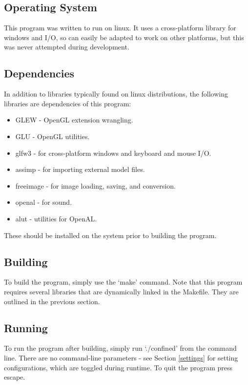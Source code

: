 \documentclass{book}
\begin{document}
    \subsection{Operating System}
      This program was written to run on linux. It uses a cross-platform library for windows and I/O, so can easily be adapted to work on other platforms, but this was never attempted during development.

    \subsection{Dependencies}
      In addition to libraries typically found on linux distributions, the following libraries are dependencies of this program:
      \begin{itemize}
        \item GLEW - OpenGL extension wrangling.
        \item GLU - OpenGL utilities.
        \item glfw3 - for cross-platform windows and keyboard and mouse I/O.
        \item assimp - for importing external model files.
        \item freeimage - for image loading, saving, and conversion.
        \item openal - for sound.
        \item alut - utilities for OpenAL.
      \end{itemize}

      These should be installed on the system prior to building the program.

    \subsection{Building}
      To build the program, simply use the `make' command.
      Note that this program requires several libraries that are dynamically linked in the Makefile. They are outlined in the previous section.

    \subsection{Running}
      To run the program after building, simply run `./confined' from the command line.
      There are no command-line parameters - see Section \ref{settings} for setting configurations, which are toggled during runtime.
      To quit the program press escape.
\end{document}
